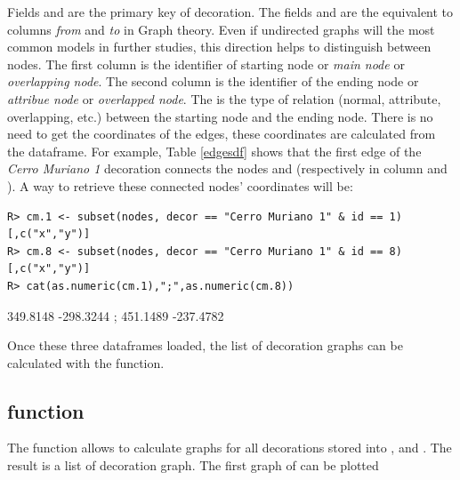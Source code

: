 \documentclass[article]{jss}\usepackage{knitr}
\begin{document}
Fields  and  are the primary key of decoration. The fields  and  are the equivalent to columns \emph{from} and \emph{to} in Graph theory. Even if undirected graphs will the most common models in further studies, this direction helps to distinguish between nodes. The first column  is the identifier of starting node or \emph{main node} or \emph{overlapping node}. The second column  is the identifier of the ending node or \emph{attribue node} or \emph{overlapped node}. The  is the type of relation (normal, attribute, overlapping, etc.) between the starting node and the ending node. There is no need to get the coordinates of the edges, these coordinates are calculated from the  dataframe. For example, Table \ref{edgesdf} shows that the first edge of the \emph{Cerro Muriano 1} decoration connects the nodes  and  (respectively in column  and ). A way to retrieve these connected nodes' coordinates will be:

\begin{kframe}
\begin{verbatim}
R> cm.1 <- subset(nodes, decor == "Cerro Muriano 1" & id == 1)[,c("x","y")]
R> cm.8 <- subset(nodes, decor == "Cerro Muriano 1" & id == 8)[,c("x","y")]
R> cat(as.numeric(cm.1),";",as.numeric(cm.8))
\end{verbatim}
\end{kframe}349.8148 -298.3244 ; 451.1489 -237.4782

Once these three dataframes loaded, the list of decoration graphs can be calculated with the  function.

\subsection{ function} \label{sec:funlistdec}

The  function allows to calculate graphs for all decorations stored into ,  and . The result is a list of decoration graph. The first graph of can be plotted
\end{document}
